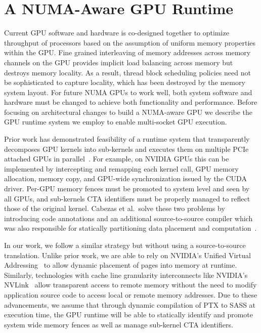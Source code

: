 \section{A NUMA-Aware GPU Runtime}

Current GPU software and hardware is co-designed together to optimize 
throughput of processors based on the assumption of uniform memory properties 
within the GPU. Fine grained interleaving of memory addresses across memory 
channels on the GPU provides implicit load balancing across memory but destroys 
memory locality.  As a result, thread block scheduling policies need not 
be sophisticated to capture locality, which has been destroyed by the 
memory system layout.  For future NUMA GPUs to work well, both system software and 
hardware must be changed to achieve both functionality and performance.  Before 
focusing on architectural changes to build a NUMA-aware GPU we describe the GPU 
runtime system we employ to enable multi-socket GPU execution.

Prior work has demonstrated feasibility of a runtime 
system that transparently decomposes GPU kernels into sub-kernels and executes 
them on multiple PCIe attached GPUs in parallel~\cite{Cabezas2015, kim2011achieving, lee2013transparent}. 
For example, on NVIDIA GPUs 
this can be implemented by intercepting and remapping each kernel call, GPU 
memory allocation, memory copy, and GPU-wide synchronization issued by the CUDA 
driver. Per-GPU memory fences must be promoted to 
system level and seen by all GPUs, and sub-kernels CTA 
identifiers must be properly managed to reflect those of the original kernel. Cabezas et al.~solve 
these two problems by introducing  code 
annotations and an additional source-to-source compiler which was also 
responsible for statically partitioning data placement and computation~\cite{Cabezas2015}.

In our work, we follow a similar strategy but without using a source-to-source
translation. Unlike prior work, we are able to rely on NVIDIA's Unified Virtual 
Addressing~\cite{UVM} to allow dynamic placement of pages into memory at
runtime. Similarly, technologies with
cache line granularity interconnects like NVIDIA's NVLink~\cite{NVLINK} allow
transparent access to remote memory without the need to modify application
source code to access local or remote memory addresses.  Due to these
advancements, we assume that through dynamic compilation of PTX to SASS at
execution time, the GPU runtime will be able to statically identify and promote 
system wide memory fences as well as manage sub-kernel CTA identifiers.


